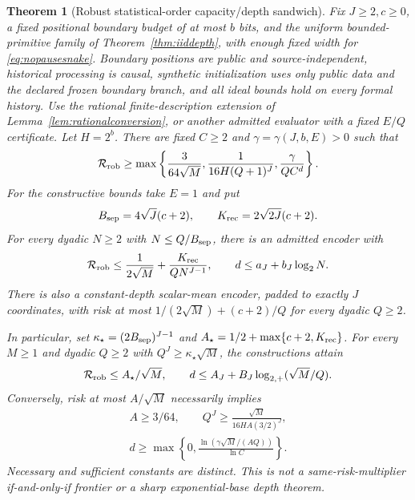 \documentclass[11pt,letterpaper]{article}
\newtheorem{theorem}{Theorem}[section]
\theoremstyle{definition}\newtheorem{definition}[theorem]{Definition}
\theoremstyle{remark}\newtheorem{remark}[theorem]{Remark}
\newcommand{\Risk}{\mathcal{R}}
\begin{document}
\begin{theorem}[Robust statistical-order capacity/depth sandwich]\label{thm:robustdepth}
Fix $J\ge2,c\ge0$, a fixed positional boundary budget of at most $b$ bits, and the uniform bounded-primitive family of Theorem~\ref{thm:iiddepth}, with enough fixed width for \eqref{eq:nopausesnake}. Boundary positions are public and source-independent, historical processing is causal, synthetic initialization uses only public data and the declared frozen boundary branch, and all ideal bounds hold on every formal history. Use the rational finite-description extension of Lemma~\ref{lem:rationalconversion}, or another admitted evaluator with a fixed $E/Q$ certificate. Let $H=2^b$. There are fixed $C\ge2$ and $\gamma=\gamma(J,b,E)>0$ such that
\begin{equation}\label{eq:robustdepthlower}
 \Risk_{\rm rob}\ge
 \max\left\{\frac3{64\sqrt M},\frac1{16H(Q+1)^J},
                    \frac\gamma{QC^d}\right\}.
\end{equation}
For the constructive bounds take $E=1$ and put
\[
 B_{\rm sep}=4\sqrt J(c+2),\qquad K_{\rm rec}=2\sqrt{2J}(c+2).
\]
For every dyadic $N\ge2$ with $N\le Q/B_{\rm sep}$, there is an admitted encoder with
\begin{equation}\label{eq:robustdepthupper}
 \Risk_{\rm rob}\le\frac1{2\sqrt M}
             +\frac{K_{\rm rec}}{QN^{J-1}},\qquad
 d\le a_J+b_J\log_2N.
\end{equation}
There is also a constant-depth scalar-mean encoder, padded to exactly $J$ coordinates, with risk at most
$1/(2\sqrt M)+(c+2)/Q$ for every dyadic $Q\ge2$.

In particular, set $\kappa_\star=(2B_{\rm sep})^{J-1}$ and
$A_\star=1/2+\max\{c+2,K_{\rm rec}\}$. For \emph{every} $M\ge1$ and dyadic $Q\ge2$ with $Q^J\ge\kappa_\star\sqrt M$, the constructions attain
\begin{equation}\label{eq:robuststatsufficient}
 \Risk_{\rm rob}\le A_\star/\sqrt M,\qquad
 d\le A_J+B_J\log_{2,+}(\sqrt M/Q).
\end{equation}
Conversely, risk at most $A/\sqrt M$ necessarily implies
\begin{equation}\label{eq:robuststatnecessary}
 \begin{gathered}
 A\ge3/64,\qquad
 Q^J\ge\frac{\sqrt M}{16HA(3/2)^J},\\
 d\ge\max\left\{0,\frac{\ln(\gamma\sqrt M/(AQ))}{\ln C}\right\}.
 \end{gathered}
\end{equation}
Necessary and sufficient constants are distinct. This is not a same-risk-multiplier if-and-only-if frontier or a sharp exponential-base depth theorem.
\end{theorem}
\end{document}
